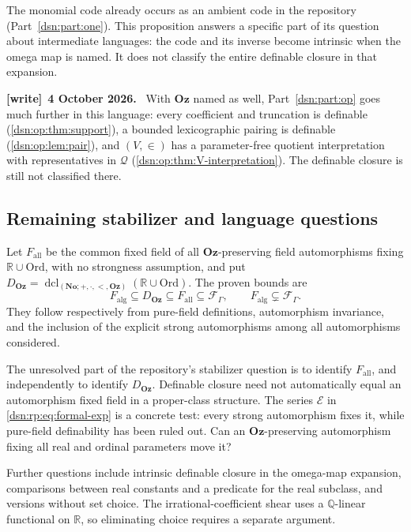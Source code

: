\documentclass[11pt,a4paper]{article}
\numberwithin{equation}{section}
\theoremstyle{definition}
\theoremstyle{remark}
\newcommand{\No}{\mathbf{No}}
\newcommand{\Oz}{\mathbf{Oz}}
\newcommand{\Ord}{\mathrm{Ord}}
\newcommand{\Q}{\mathbb Q}
\newcommand{\R}{\mathbb R}
\newenvironment{writenote}[1][]{\par\medskip\begingroup\small\noindent\textbf{[write]}\if\relax\detokenize{#1}\relax\else~\textbf{#1.}\fi~\ignorespaces}{\par\endgroup\medskip}
\newcommand{\Qrange}{\mathcal Q}
\begin{document}
The monomial code already occurs as an ambient code in the repository
(Part~\ref{dsn:part:one}). This proposition answers a specific part of
its question about intermediate languages: the code and its inverse
become intrinsic when the omega map is named. It does not classify
the entire definable closure in that expansion.
\begin{writenote}[4 October 2026]
With $\Oz$ named as well, Part~\ref{dsn:part:op} goes much further in this
language: every coefficient and truncation is definable
(\cref{dsn:op:thm:support}), a bounded lexicographic pairing is definable
(\cref{dsn:op:lem:pair}), and $(V,\in)$ has a parameter-free quotient
interpretation with representatives in $\Qrange$
(\cref{dsn:op:thm:V-interpretation}). The definable closure is still not
classified there.
\end{writenote}


\subsection{Remaining stabilizer and language questions}

Let \(F_{\mathrm{all}}\) be the common fixed field of all
\(\Oz\)-preserving field automorphisms fixing \(\R\cup\Ord\), with no
strongness assumption, and put
\(D_{\Oz}=\operatorname{dcl}_{(\No;+,\cdot,<,\Oz)}(\R\cup\Ord)\).
The proven bounds are
\begin{equation}\label{dsn:rp:eq:open-bounds}
 F_{\mathrm{alg}}\subseteq D_{\Oz}
 \subseteq F_{\mathrm{all}}\subseteq\mathcal F_\Gamma,\qquad
 F_{\mathrm{alg}}\subsetneq\mathcal F_\Gamma.
\end{equation}
They follow respectively from pure-field definitions, automorphism
invariance, and the inclusion of the explicit strong automorphisms
among all automorphisms considered.

The unresolved part of the repository's stabilizer question is to
identify \(F_{\mathrm{all}}\), and independently to identify
\(D_{\Oz}\). Definable closure need not automatically equal an
automorphism fixed field in a proper-class structure.
The series \(\mathcal E\) in \eqref{dsn:rp:eq:formal-exp} is a concrete test:
every strong automorphism fixes it, while pure-field definability
has been ruled out. Can an \(\Oz\)-preserving automorphism fixing
all real and ordinal parameters move it?

Further questions include intrinsic definable closure in the
omega-map expansion, comparisons between real constants and a
predicate for the real subclass, and versions without set choice.
The irrational-coefficient shear uses a \(\Q\)-linear functional on
\(\R\), so eliminating choice requires a separate argument.
\end{document}
